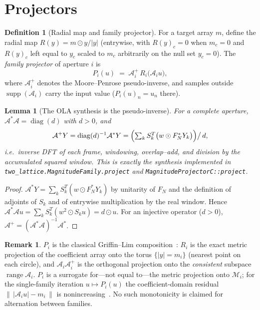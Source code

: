 \documentclass[11pt]{article}
\newtheorem{lemma}[theorem]{Lemma}
\theoremstyle{definition}
\newtheorem{definition}[theorem]{Definition}
\newtheorem{remark}[theorem]{Remark}
\newcommand{\cA}{\mathcal{A}}
\newcommand{\cM}{\mathcal{M}}
\newcommand{\norm}[1]{\lVert #1\rVert}
\newcommand{\abs}[1]{\lvert #1\rvert}
\newcommand{\diag}{\operatorname{diag}}
\newcommand{\supp}{\operatorname{supp}}
\begin{document}
\section{Projectors}\label{sec:projectors}

\begin{definition}[Radial map and family projector]\label{def:projector}
For a target array $m$, define the radial map
$R(y)=m\odot y/\abs{y}$ (entrywise, with $R(y)_c=0$ when $m_c=0$ and
$R(y)_c$ left equal to $y_c$ scaled to $m_c$ arbitrarily on the null set
$y_{c}=0$).  The \emph{family projector} of aperture $i$ is
\[
  P_{i}(u)\;=\;\cA_{i}^{+}\,R_{i}\bigl(\cA_{i}u\bigr),
\]
where $\cA_{i}^{+}$ denotes the Moore--Penrose pseudo-inverse, and samples
outside $\supp(\cA_i)$ carry the input value ($P_i(u)_n=u_n$ there).
\end{definition}

\begin{lemma}[The OLA synthesis is the pseudo-inverse]\label{lem:pinv}
For a complete aperture, $\cA^{*}\cA=\diag(d)$ with $d>0$, and
\[
  \cA^{+}Y=\diag(d)^{-1}\cA^{*}Y
  =\Bigl(\textstyle\sum_{k}S_{k}^{T}\bigl(w\odot F_{N}^{*}Y_{k}\bigr)\Bigr)
  \big/\,d ,
\]
i.e.\ inverse DFT of each frame, windowing, overlap--add, and division by
the accumulated squared window.  This is exactly the synthesis implemented
in \texttt{two\_lattice.MagnitudeFamily.project} and
\texttt{MagnitudeProjectorC::project}.
\end{lemma}

\begin{proof}
$\cA^{*}Y=\sum_{k}S_{k}^{T}(w\odot F_{N}^{*}Y_{k})$ by unitarity of
$F_{N}$ and the definition of adjoints of $S_k$ and of entrywise
multiplication by the real window.  Hence
$\cA^{*}\cA u=\sum_{k}S_{k}^{T}(w^{2}\odot S_{k}u)=d\odot u$.  For an
injective operator ($d>0$), $\cA^{+}=(\cA^{*}\cA)^{-1}\cA^{*}$.
\end{proof}

\begin{remark}
$P_i$ is the classical Griffin--Lim composition~\cite{griffinlim1984}:
$R_i$ is the exact metric projection of the coefficient array onto the
torus $\{\abs{y}=m_i\}$ (nearest point on each circle), and
$\cA_i\cA_i^{+}$ is the orthogonal projection onto the \emph{consistent}
subspace $\operatorname{range}\cA_i$.  $P_i$ is a surrogate for---not equal
to---the metric projection onto $\cM_i$; for the single-family iteration
$u\mapsto P_i(u)$ the coefficient-domain residual
$\norm{\,\abs{\cA_i u}-m_i\,}$ is nonincreasing~\cite{griffinlim1984}.  No
such monotonicity is claimed for alternation between families.
\end{remark}
\end{document}
